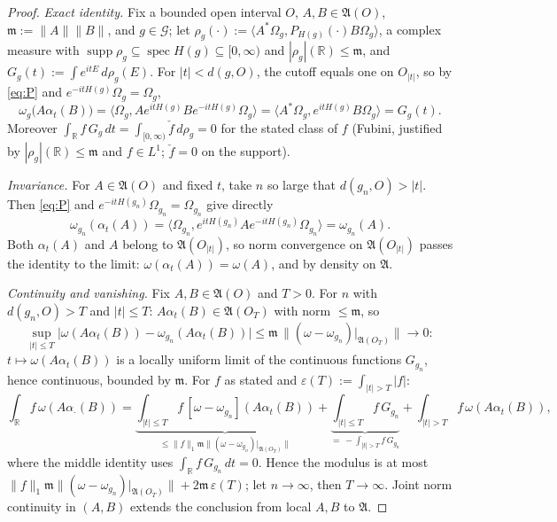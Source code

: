 \documentclass[11pt,a4paper]{article}
\theoremstyle{plain}
\theoremstyle{definition}
\theoremstyle{plain}
\theoremstyle{definition}
\newcommand{\R}{\mathbb{R}}
\newcommand{\A}{\mathfrak{A}}
\newcommand{\G}{\mathcal{G}}
\newcommand{\Om}{\Omega}
\newcommand{\ip}[2]{\langle #1,#2\rangle}
\DeclareMathOperator{\supp}{supp}
\DeclareMathOperator{\spec}{spec}
\begin{document}
\begin{proof}
\emph{Exact identity.} Fix a bounded open interval $O$, $A,B\in\A(O)$,
$\mathfrak m:=\|A\|\|B\|$, and $g\in\G$; let
$\rho_g(\cdot):=\ip{A^*\Om_g}{P_{H(g)}(\cdot)B\Om_g}$, a complex measure with
$\supp\rho_g\subseteq\spec H(g)\subseteq[0,\infty)$ and $|\rho_g|(\R)\le\mathfrak m$, and
$G_g(t):=\int e^{itE}\,d\rho_g(E)$. For $|t|<d(g,O)$, the cutoff equals one on
$O_{|t|}$, so by \eqref{eq:P} and $e^{-itH(g)}\Om_g=\Om_g$,
\[
  \omega_g\bigl(A\alpha_t(B)\bigr)
  =\ip{\Om_g}{Ae^{itH(g)}Be^{-itH(g)}\Om_g}
  =\ip{A^*\Om_g}{e^{itH(g)}B\Om_g}=G_g(t) .
\]
Moreover $\int_\R f\,G_g\,dt=\int_{[0,\infty)}\check f\,d\rho_g=0$ for the stated class of
$f$ (Fubini, justified by $|\rho_g|(\R)\le\mathfrak m$ and $f\in L^1$; $\check f=0$ on the
support).

\emph{Invariance.} For $A\in\A(O)$ and fixed $t$, take $n$ so large that
$d(g_n,O)>|t|$. Then \eqref{eq:P} and $e^{-itH(g_n)}\Om_{g_n}=\Om_{g_n}$ give directly
\[
 \omega_{g_n}(\alpha_t(A))
 =\ip{\Om_{g_n}}{e^{itH(g_n)}Ae^{-itH(g_n)}\Om_{g_n}}
 =\omega_{g_n}(A).
\]
Both $\alpha_t(A)$ and $A$ belong to $\A(O_{|t|})$, so norm convergence on
$\A(O_{|t|})$ passes the identity to the limit:
$\omega(\alpha_t(A))=\omega(A)$, and by density on $\A$.

\emph{Continuity and vanishing.} Fix $A,B\in\A(O)$ and $T>0$. For $n$ with
$d(g_n,O)>T$ and $|t|\le T$: $A\alpha_t(B)\in\A(O_T)$ with norm $\le\mathfrak m$, so
\[
  \sup_{|t|\le T}\bigl|\omega(A\alpha_t(B))-\omega_{g_n}(A\alpha_t(B))\bigr|
  \le\mathfrak m\,\bigl\|(\omega-\omega_{g_n})|_{\A(O_T)}\bigr\|\longrightarrow0 :
\]
$t\mapsto\omega(A\alpha_t(B))$ is a locally uniform limit of the continuous functions
$G_{g_n}$, hence continuous, bounded by $\mathfrak m$. For $f$ as stated and
$\varepsilon(T):=\int_{|t|>T}|f|$:
\[
  \int_\R f\,\omega(A\alpha_\cdot(B))
  =\underbrace{\int_{|t|\le T}f\,[\omega-\omega_{g_n}](A\alpha_t(B))}_{\textstyle
  \le\|f\|_1\mathfrak m\|(\omega-\omega_{g_n})|_{\A(O_T)}\|}
  +\underbrace{\int_{|t|\le T}f\,G_{g_n}}_{\textstyle=\,-\int_{|t|>T}f\,G_{g_n}}
  +\int_{|t|>T}f\,\omega(A\alpha_t(B)) ,
\]
where the middle identity uses $\int_\R f\,G_{g_n}\,dt=0$. Hence the modulus is at most
$\|f\|_1\mathfrak m\|(\omega-\omega_{g_n})|_{\A(O_T)}\|+2\mathfrak m\,\varepsilon(T)$;
let $n\to\infty$, then $T\to\infty$. Joint norm continuity in $(A,B)$ extends the
conclusion from local $A,B$ to $\A$.
\end{proof}
\end{document}
